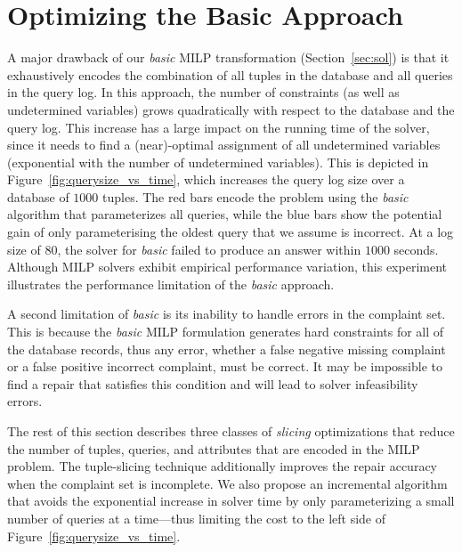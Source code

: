 
\section{Optimizing the Basic Approach}
\label{sec:opt}

A major drawback of our \emph{basic} MILP transformation (Section~\ref{sec:sol}) is
that it exhaustively encodes the combination of all tuples in the database and all queries
in the query log.  In this approach, the number of constraints (as well as undetermined variables) 
grows quadratically with respect to the database and the query log.
This increase has a large impact on the running time of the solver, since it needs to find a (near)-optimal 
assignment of all undetermined variables (exponential with the number of undetermined variables).
This is depicted in Figure~\ref{fig:querysize_vs_time}, which increases the query log size over a database of $1000$ tuples.  
The red bars encode the problem using  the \emph{basic} algorithm that parameterizes all queries, while the blue bars show the potential gain of only parameterising the oldest query that we assume is incorrect.
At a log size of $80$, the solver for \emph{basic} failed to produce an answer within $1000$ seconds.
Although MILP solvers exhibit empirical performance variation,
this experiment illustrates the performance limitation of the \emph{basic} approach. 

A second limitation of \emph{basic} is its inability to handle errors in the complaint set.
This is because the \emph{basic} MILP formulation generates hard constraints for all of the database records, thus any error, whether a false negative missing complaint or a false positive incorrect complaint, must be correct.
It may be impossible to find a repair that satisfies this condition and will lead to solver infeasibility errors.


The rest of this section describes three classes of \emph{slicing} optimizations that 
reduce the number of tuples, queries, and attributes that are encoded in the MILP problem. 
The tuple-slicing technique additionally improves the repair accuracy when the complaint set is incomplete. 
We also propose an incremental algorithm that avoids the exponential increase in solver time by only parameterizing a small number of queries at a time---thus limiting
the cost to the left side of Figure~\ref{fig:querysize_vs_time}.







